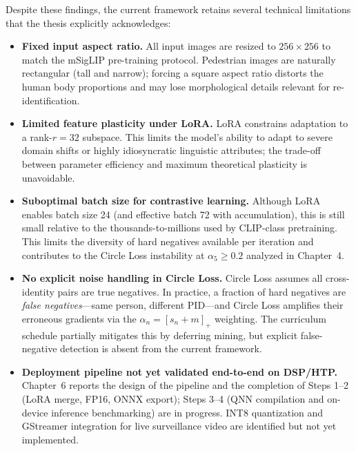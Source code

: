\documentclass[../main.tex]{subfiles}
\begin{document}
\noindent Despite these findings, the current framework retains several technical limitations that the thesis explicitly acknowledges:

\begin{itemize}
    \item \textbf{Fixed input aspect ratio.} All input images are resized to $256 \times 256$ to match the mSigLIP pre-training protocol. Pedestrian images are naturally rectangular (tall and narrow); forcing a square aspect ratio distorts the human body proportions and may lose morphological details relevant for re-identification.

    \item \textbf{Limited feature plasticity under LoRA.} LoRA constrains adaptation to a rank-$r{=}32$ subspace. This limits the model's ability to adapt to severe domain shifts or highly idiosyncratic linguistic attributes; the trade-off between parameter efficiency and maximum theoretical plasticity is unavoidable.

    \item \textbf{Suboptimal batch size for contrastive learning.} Although LoRA enables batch size 24 (and effective batch 72 with accumulation), this is still small relative to the thousands-to-millions used by CLIP-class pretraining. This limits the diversity of hard negatives available per iteration and contributes to the Circle Loss instability at $\alpha_5 \geq 0.2$ analyzed in Chapter~4.

    \item \textbf{No explicit noise handling in Circle Loss.} Circle Loss assumes all cross-identity pairs are true negatives. In practice, a fraction of hard negatives are \textit{false negatives}---same person, different PID---and Circle Loss amplifies their erroneous gradients via the $\alpha_n = [s_n + m]_+$ weighting. The curriculum schedule partially mitigates this by deferring mining, but explicit false-negative detection is absent from the current framework.

    \item \textbf{Deployment pipeline not yet validated end-to-end on DSP/HTP.} Chapter~6 reports the design of the pipeline and the completion of Steps 1--2 (LoRA merge, FP16, ONNX export); Steps 3--4 (QNN compilation and on-device inference benchmarking) are in progress. INT8 quantization and GStreamer integration for live surveillance video are identified but not yet implemented.
\end{itemize}
\end{document}
